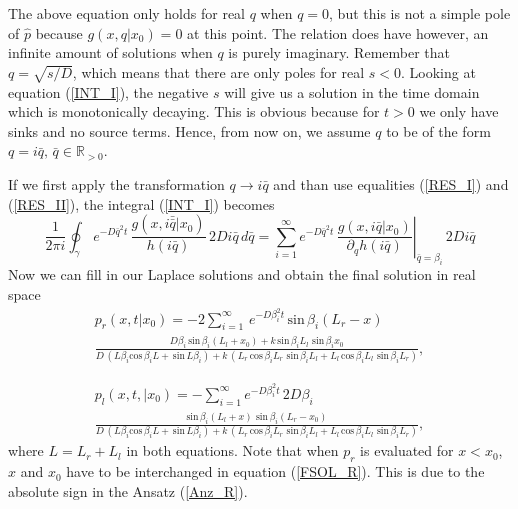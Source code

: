 The above equation only holds for real $q$ when $q = 0$, but this is not a simple pole of $\hat{p}$ because $g(x,q|x_0) = 0$ at this point. The relation does have however, an infinite amount of solutions when $q$ is purely imaginary. Remember that $q = \sqrt{s/D}$, which means that there are only poles for real $s < 0$. Looking at equation (\ref{INT_I}), the negative $s$ will give us a solution in the time domain which is monotonically decaying. This is obvious because for $t > 0$ we only have sinks and no source terms. Hence, from now on, we assume $q$ to be of the form $q = i \bar{q}, \, \bar{q} \in \mathbb{R}_{>0}$.

If we first apply the transformation $q \rightarrow i \bar{q}$ and than use equalities (\ref{RES_I}) and (\ref{RES_II}), the integral (\ref{INT_I}) becomes
\begin{equation} 
 \frac{1}{2 \pi i} \oint_{\gamma}
 \, e^{- D \bar{q}^2 t} \, \frac{g(x,i \bar{\bar{q}}|x_0)}{h(i \bar{q})} \, 2 D i \bar{q} \, d\bar{q} = \sum_{i=1}^{\infty} e^{ - D \bar{q}^2 t} \, \left. \frac{g(x,i \bar{q}|x_0)}{\partial_q h(i \bar{q})} \right|_{\bar{q} = \beta_i} \, 2 D i \bar{q}
\end{equation}
Now we can fill in our Laplace solutions and obtain the final solution in real space
\begin{multline}
 p_r(x,t|x_0) = -2 \sum_{i=1}^{\infty} \, e^{- D \beta_i ^2 t} \, \mathrm{sin} \, \beta_i (L_r - x) \\ 
\frac{D \beta_i \, \mathrm{sin} \, \beta_i (L_l + x_0) + k \, \mathrm{sin} \, \beta_i L_l \,\, \mathrm{sin} \, \beta_i x_0}{D \, (L \beta_i \mathrm{cos} \, \beta_i L + \, \mathrm{sin} \, L \beta_i ) + k \,( L_r \, \mathrm{cos} \, \beta_i L_r \,\, \mathrm{sin} \, \beta_i L_l + L_l \, \mathrm{cos} \, \beta_i L_l \,\, \mathrm{sin} \, \beta_i L_r )},
 \label{FSOL_R}
\end{multline}

\begin{multline}
 p_l(x,t,|x_0) = -\sum_{i=1}^{\infty} e^{- D \beta_i ^2 t} \, 2 D \beta_i \, \\ 
\frac{\mathrm{sin} \, \beta_i (L_l + x) \,\, \mathrm{sin} \, \beta_i (L_r - x_0)}{D \, (L \beta_i \mathrm{cos} \, \beta_i L + \, \mathrm{sin} \, L \beta_i ) + k \,( L_r \, \mathrm{cos} \, \beta_i L_r \,\, \mathrm{sin} \, \beta_i L_l + L_l \, \mathrm{cos} \, \beta_i L_l \,\, \mathrm{sin} \, \beta_i L_r )},
\label{FSOL_L}
\end{multline}
where $L=L_r + L_l$ in both equations. Note that when $p_r$ is evaluated for $x<x_0$, $x$ and $x_0$ have to be interchanged in equation (\ref{FSOL_R}). This is due to the absolute sign in the Ansatz (\ref{Anz_R}).

